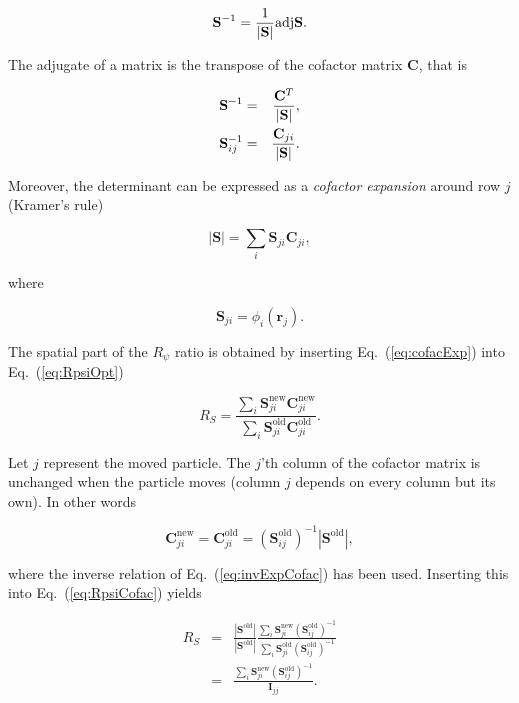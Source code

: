 \begin{equation*}
 \mathbf{S}^{-1} = \frac{1}{|\mathbf{S}|}\mathrm{adj} \mathbf{S}.
\end{equation*}

The adjugate of a matrix is the transpose of the cofactor matrix $\mathbf{C}$, that is

\begin{eqnarray}
 \mathbf{S}^{-1} &=& \frac{\mathbf{C}^T}{|\mathbf{S}|}, \\
 \mathbf{S}^{-1}_{ij} &=& \frac{\mathbf{C}_{ji}}{|\mathbf{S}|}\label{eq:invExpCofac}.
\end{eqnarray}

Moreover, the determinant can be expressed as a \textit{cofactor expansion} around row $j$ (Kramer's rule) \cite{linAlg}

\begin{equation}
\label{eq:cofacExp}
 |\mathbf{S}| = \sum_i \mathbf{S}_{ji} \mathbf{C}_{ji},
\end{equation}

where 

\begin{equation}
  \mathbf{S}_{ji} = \phi_i(\mathbf{r}_j). \label{eq:slaterMatPhi}
\end{equation}


The spatial part of the $R_\psi$ ratio is obtained by inserting Eq.~(\ref{eq:cofacExp}) into Eq.~(\ref{eq:RpsiOpt})

\begin{equation}
\label{eq:RpsiCofac}
 R_S = \frac{\sum_i \mathbf{S}_{ji}^\mathrm{new}\mathbf{C}_{ji}^\mathrm{new}}{\sum_i \mathbf{S}_{ji}^\mathrm{old}\mathbf{C}_{ji}^\mathrm{old}}.
\end{equation}

Let $j$ represent the moved particle. The $j$'th column of the cofactor matrix is unchanged when the particle moves (column $j$ depends on every column but its own). In other words

\begin{equation}
 \mathbf{C}_{ji}^\mathrm{new} = \mathbf{C}_{ji}^\mathrm{old} = (\mathbf{S}^\mathrm{old}_{ij})^{-1}|\mathbf{S}^\mathrm{old}|,
\end{equation}

where the inverse relation of Eq.~(\ref{eq:invExpCofac}) has been used. Inserting this into Eq.~(\ref{eq:RpsiCofac}) yields

\begin{eqnarray}
  R_S &=& \frac{|\mathbf{S}^\mathrm{old}|}{|\mathbf{S}^\mathrm{old}|}\frac{\sum_i \mathbf{S}_{ji}^\mathrm{new}(\mathbf{S}_{ij}^\mathrm{old})^{-1}}{\sum_i \mathbf{S}_{ji}^\mathrm{old}(\mathbf{S}_{ij}^\mathrm{old})^{-1}} \nonumber\\
         &=& \frac{\sum_i \mathbf{S}_{ji}^\mathrm{new}(\mathbf{S}_{ij}^\mathrm{old})^{-1}}{\mathbf{I}_{jj}}. \nonumber
\end{eqnarray}

